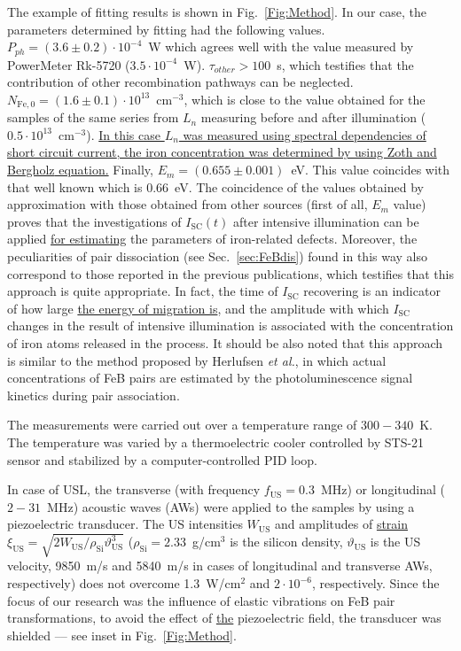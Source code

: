 \documentclass[%
 aip,jap,
 amsmath,amssymb,
 reprint,%
]{revtex4-1}
\begin{document}
The example of fitting results is shown in Fig.~\ref{Fig:Method}.
In our case, the parameters determined by fitting had the following values.
$P_{ph} = (3.6\pm0.2)\cdot10^{-4}$~W which agrees well
with the value measured by PowerMeter Rk-5720 ($3.5\cdot10^{-4}$~W).
$\tau_{other}>100$~s, which testifies that the contribution of other recombination pathways can be neglected.
$N_\mathrm{Fe,0}=(1.6\pm0.1)\cdot10^{13}$~cm$^{-3}$,
which is close to the value obtained for the samples of the same series from $L_n$ measuring before and after illumination ($0.5\cdot10^{13}$~cm$^{-3}$).
\textcolor[rgb]{0.00,0.07,1.00}{\uline{
In this case $L_{n}$ was measured using spectral dependencies of short circuit current\cite{LnIscMethod},
the iron concentration was determined by using Zoth and Bergholz\cite{FeB_Zong} equation.}}
Finally, $E_m = (0.655\pm0.001)$~eV.
This value coincides with that well known \cite{FeBAssJAP2014,FeBkinAPL2008,FeBKin2019,FeBAssSST2011} which is $0.66$~eV.
The coincidence of the values obtained by approximation
with those obtained from other sources (first of all, $E_m$ value) proves
that the investigations of $I_\mathrm{SC}(t)$ after intensive illumination can be applied
\textcolor[rgb]{0.00,0.07,1.00}{\uline{for estimating}} the parameters of iron-related defects.
Moreover, the peculiarities of pair dissociation (see Sec.~\ref{sec:FeBdis}) found in this way also correspond to those reported in the previous publications, which testifies that this approach is quite appropriate.
In fact, the time of $I_\mathrm{SC}$ recovering is an indicator of how large \textcolor[rgb]{0.00,0.07,1.00}{\uline{the energy of migration is}},
and the amplitude with which $I_\mathrm{SC}$ changes in the result of intensive illumination is associated with the concentration of iron atoms released in the process.
It should be also noted that this approach is similar to the method proposed
by Herlufsen \emph{et al.}\cite{FeMethod2012}, in which actual concentrations of FeB pairs are estimated by the photoluminescence signal kinetics during pair association.

The measurements were carried out over a temperature range of $300-340$~K.
The temperature was varied by a thermoelectric cooler controlled by STS-21 sensor and stabilized by a computer-controlled PID loop.

In case of USL, the transverse (with frequency $f_\mathrm{US}=0.3$~MHz) or
longitudinal ($2-31$~MHz) acoustic waves (AWs) were applied to the samples by using a piezoelectric transducer.
The US intensities $W_\mathrm{US}$ and amplitudes of \textcolor[rgb]{0.00,0.07,1.00}{\uline{strain}}
$\xi_\mathrm{US}=\sqrt{2W_\mathrm{US}/\rho_\mathrm{Si}\vartheta_\mathrm{US}^3}$
($\rho_\mathrm{Si}=2.33$~g/cm$^3$ is the silicon density,
$\vartheta_\mathrm{US}$ is the US velocity, 9850~m/s and 5840~m/s in cases of longitudinal and transverse AWs, respectively)
does not overcome 1.3~W/cm$^2$ and $2\cdot10^{-6}$, respectively.
Since the focus of our research was the influence of elastic vibrations on  FeB pair transformations,   to avoid the effect of
\textcolor[rgb]{0.00,0.07,1.00}{\uline{the}} piezoelectric field, the transducer was shielded --– see inset in Fig.~\ref{Fig:Method}.
\end{document}
